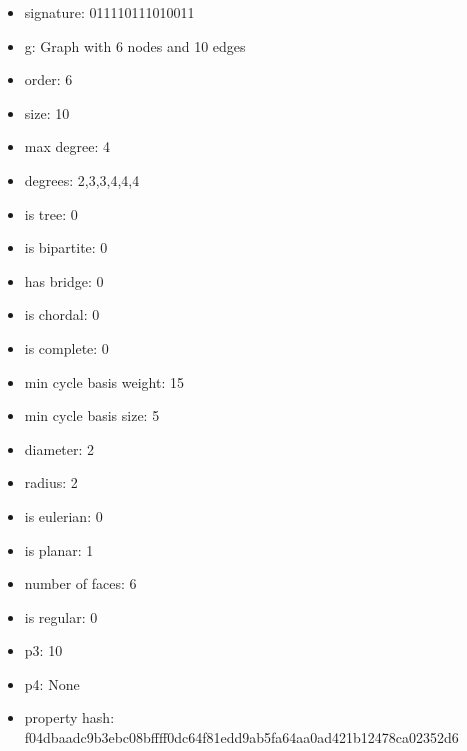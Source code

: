 \begin{itemize}
\item signature: 011110111010011
\item g: Graph with 6 nodes and 10 edges
\item order: 6
\item size: 10
\item max degree: 4
\item degrees: 2,3,3,4,4,4
\item is tree: 0
\item is bipartite: 0
\item has bridge: 0
\item is chordal: 0
\item is complete: 0
\item min cycle basis weight: 15
\item min cycle basis size: 5
\item diameter: 2
\item radius: 2
\item is eulerian: 0
\item is planar: 1
\item number of faces: 6
\item is regular: 0
\item p3: 10
\item p4: None
\item property hash: f04dbaadc9b3ebc08bffff0dc64f81edd9ab5fa64aa0ad421b12478ca02352d6
\end{itemize}
\newpage
\begin{figure}
\end{figure}
